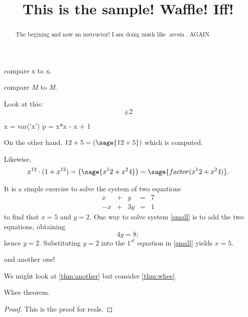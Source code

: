 \documentclass{ximera}
\title[Breal-grond]{This is the sample! Waffle!  Iff!}
\begin{document}
\begin{abstract}
  The begining and now an instructor! I am doing math like $\arcsin$. AGAIN
\end{abstract}

\maketitle

compare $\mathrm{x}$ to x.

compare $M$ to \textit{M}.

Look at this:
\[
  \pm 2
\]

\begin{sagesilent}
  x = var('x')
  p = x*x - x + 1
\end{sagesilent}

On the other hand, $12 + 5 = \left( \sage{12+5} \right)$ which is computed.

Likewise,
\[
  x^{12} \cdot (1 + x^{12}) = \left(\sage{x^12 + x^24}\right) = \sage{factor(x^12 + x^24)}.
\]

It is a simple exercise to solve the system of two equations
\begin{equation} \label{small}
\begin{array}{rcrcr}
 x & + & y & = & 7 \\
-x & + & 3y & = & 1
\end{array}
\end{equation}
to find that $x=5$ and $y=2$.  One way to solve
system \eqref{small} is to add the two equations, obtaining
\[
4y=8;
\]
hence $y=2$.  Substituting $y=2$ into the $1^{st}$ equation in
\ref{small} yields $x=5$.





and another one!



We might look at \ref{thm:another} but consider \ref{thm:whee}.

\begin{theorem}
  \label{thm:whee}  Whee theorem.
\end{theorem}
\begin{proof}
This is the proof for reals.
\end{proof}
\end{document}

